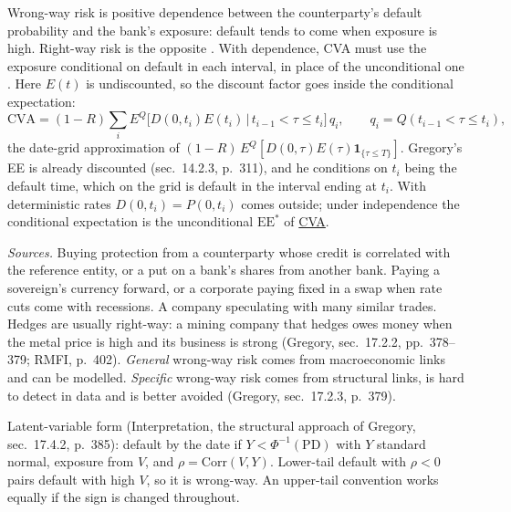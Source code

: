 \begin{qfdefinition}\label{def:wrong-way-risk}
 Wrong-way risk is positive dependence between the counterparty's default probability and the bank's exposure: default tends to come when exposure is high. Right-way risk is the opposite \citep[chap.~18, sec.~18.5, pp.~401--402]{risk-management-financial-institutions-2023}. With dependence, CVA must use the exposure conditional on default in each interval, in place of the unconditional one \citep[chap.~17, sec.~17.3.1, eq.~(17.1), p.~380]{gregory-xva-challenge-2015}. Here $E(t)$ is undiscounted, so the discount factor goes inside the conditional expectation:
\[ \mathrm{CVA}=(1-R)\sum_iE^Q\big[D(0,t_i)E(t_i)\,\big|\,t_{i-1}<\tau\le t_i\big]\,q_i,\qquad q_i=Q(t_{i-1}<\tau\le t_i), \]
the date-grid approximation of $(1-R)\,E^Q[D(0,\tau)E(\tau)\mathbf 1_{\{\tau\le T\}}]$. Gregory's EE is already discounted (sec.~14.2.3, p.~311), and he conditions on $t_i$ being the default time, which on the grid is default in the interval ending at $t_i$. With deterministic rates $D(0,t_i)=P(0,t_i)$ comes outside; under independence the conditional expectation is the unconditional $\mathrm{EE}^*$ of \hyperref[meth:credit-valuation-adjustment]{CVA}.

\emph{Sources.} Buying protection from a counterparty whose credit is correlated with the reference entity, or a put on a bank's shares from another bank. Paying a sovereign's currency forward, or a corporate paying fixed in a swap when rate cuts come with recessions. A company speculating with many similar trades. Hedges are usually right-way: a mining company that hedges owes money when the metal price is high and its business is strong (Gregory, sec.~17.2.2, pp.~378--379; RMFI, p.~402). \emph{General} wrong-way risk comes from macroeconomic links and can be modelled. \emph{Specific} wrong-way risk comes from structural links, is hard to detect in data and is better avoided (Gregory, sec.~17.2.3, p.~379).

 Latent-variable form (Interpretation, the structural approach of Gregory, sec.~17.4.2, p.~385): default by the date if $Y<\Phi^{-1}(\mathrm{PD})$ with $Y$ standard normal, exposure from $V$, and $\rho=\mathrm{Corr}(V,Y)$. Lower-tail default with $\rho<0$ pairs default with high $V$, so it is wrong-way. An upper-tail convention works equally if the sign is changed throughout.


\end{qfdefinition}
